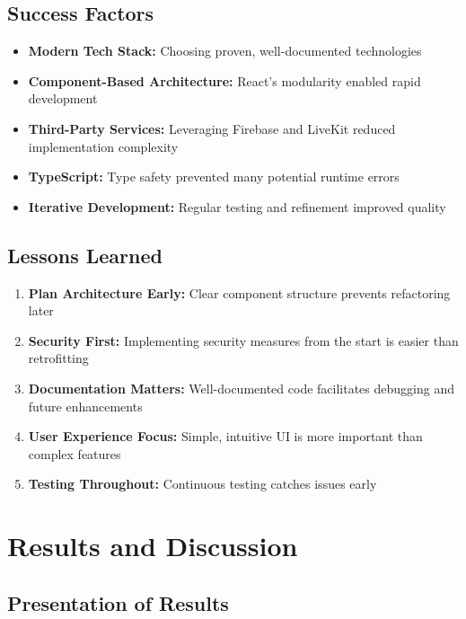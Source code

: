 \documentclass[11pt,a4paper]{article}
\begin{document}
\subsection{Success Factors}

\begin{itemize}
    \item \textbf{Modern Tech Stack:} Choosing proven, well-documented technologies
    \item \textbf{Component-Based Architecture:} React's modularity enabled rapid development
    \item \textbf{Third-Party Services:} Leveraging Firebase and LiveKit reduced implementation complexity
    \item \textbf{TypeScript:} Type safety prevented many potential runtime errors
    \item \textbf{Iterative Development:} Regular testing and refinement improved quality
\end{itemize}

\subsection{Lessons Learned}

\begin{enumerate}
    \item \textbf{Plan Architecture Early:} Clear component structure prevents refactoring later
    \item \textbf{Security First:} Implementing security measures from the start is easier than retrofitting
    \item \textbf{Documentation Matters:} Well-documented code facilitates debugging and future enhancements
    \item \textbf{User Experience Focus:} Simple, intuitive UI is more important than complex features
    \item \textbf{Testing Throughout:} Continuous testing catches issues early
\end{enumerate}

\newpage

\section{Results and Discussion}

\subsection{Presentation of Results}
\end{document}

